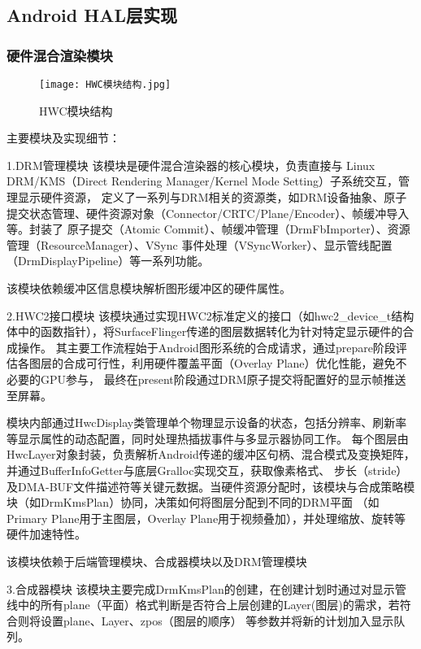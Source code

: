 \subsection{Android HAL层实现}

\subsubsection{硬件混合渲染模块}

\begin{figure}[h]
  \centering
  \texttt{[image: HWC模块结构.jpg]}
  \caption{HWC模块结构}
  \label{fig:HWC模块结构}
\end{figure}

主要模块及实现细节：

1.DRM管理模块
该模块是硬件混合渲染器的核心模块，负责直接与 Linux DRM/KMS（Direct Rendering Manager/Kernel Mode Setting）子系统交互，管理显示硬件资源，
定义了一系列与DRM相关的资源类，如DRM设备抽象、原子提交状态管理、硬件资源对象（Connector/CRTC/Plane/Encoder）、帧缓冲导入等。封装了
原子提交（Atomic Commit）、帧缓冲管理（DrmFbImporter）、资源管理（ResourceManager）、VSync 事件处理（VSyncWorker）、显示管线配置（DrmDisplayPipeline）等一系列功能。

该模块依赖缓冲区信息模块解析图形缓冲区的硬件属性。

2.HWC2接口模块
该模块通过实现HWC2标准定义的接口（如hwc2\_device\_t结构体中的函数指针），将SurfaceFlinger传递的图层数据转化为针对特定显示硬件的合成操作。
其主要工作流程始于Android图形系统的合成请求，通过prepare阶段评估各图层的合成可行性，利用硬件覆盖平面（Overlay Plane）优化性能，避免不必要的GPU参与，
最终在present阶段通过DRM原子提交将配置好的显示帧推送至屏幕。

模块内部通过HwcDisplay类管理单个物理显示设备的状态，包括分辨率、刷新率等显示属性的动态配置，同时处理热插拔事件与多显示器协同工作。
每个图层由HwcLayer对象封装，负责解析Android传递的缓冲区句柄、混合模式及变换矩阵，并通过BufferInfoGetter与底层Gralloc实现交互，获取像素格式、
步长（stride）及DMA-BUF文件描述符等关键元数据。当硬件资源分配时，该模块与合成策略模块（如DrmKmsPlan）协同，决策如何将图层分配到不同的DRM平面
（如Primary Plane用于主图层，Overlay Plane用于视频叠加），并处理缩放、旋转等硬件加速特性。

该模块依赖于后端管理模块、合成器模块以及DRM管理模块

3.合成器模块
该模块主要完成DrmKmsPlan的创建，在创建计划时通过对显示管线中的所有plane（平面）格式判断是否符合上层创建的Layer(图层)的需求，若符合则将设置plane、Layer、zpos（图层的顺序）
等参数并将新的计划加入显示队列。

